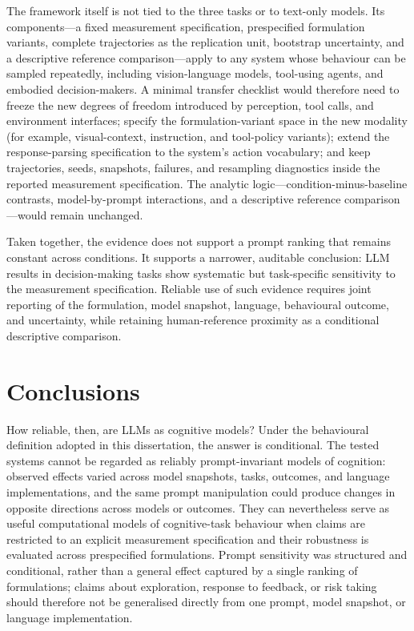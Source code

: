 \documentclass[logo,msc,inf]{infthesis}       %
\begin{document}
The framework itself is not tied to the three tasks or to text-only models. Its components---a fixed measurement specification, prespecified formulation variants, complete trajectories as the replication unit, bootstrap uncertainty, and a descriptive reference comparison---apply to any system whose behaviour can be sampled repeatedly, including vision-language models, tool-using agents, and embodied decision-makers. A minimal transfer checklist would therefore need to freeze the new degrees of freedom introduced by perception, tool calls, and environment interfaces; specify the formulation-variant space in the new modality (for example, visual-context, instruction, and tool-policy variants); extend the response-parsing specification to the system's action vocabulary; and keep trajectories, seeds, snapshots, failures, and resampling diagnostics inside the reported measurement specification. The analytic logic---condition-minus-baseline contrasts, model-by-prompt interactions, and a descriptive reference comparison---would remain unchanged.

Taken together, the evidence does not support a prompt ranking that remains constant across conditions. It supports a narrower, auditable conclusion: LLM results in decision-making tasks show systematic but task-specific sensitivity to the measurement specification. Reliable use of such evidence requires joint reporting of the formulation, model snapshot, language, behavioural outcome, and uncertainty, while retaining human-reference proximity as a conditional descriptive comparison.

\chapter{Conclusions}
\label{sec:conclusion}

How reliable, then, are LLMs as cognitive models? Under the behavioural definition adopted in this dissertation, the answer is conditional. The tested systems cannot be regarded as reliably prompt-invariant models of cognition: observed effects varied across model snapshots, tasks, outcomes, and language implementations, and the same prompt manipulation could produce changes in opposite directions across models or outcomes. They can nevertheless serve as useful computational models of cognitive-task behaviour when claims are restricted to an explicit measurement specification and their robustness is evaluated across prespecified formulations. Prompt sensitivity was structured and conditional, rather than a general effect captured by a single ranking of formulations; claims about exploration, response to feedback, or risk taking should therefore not be generalised directly from one prompt, model snapshot, or language implementation.
\end{document}
